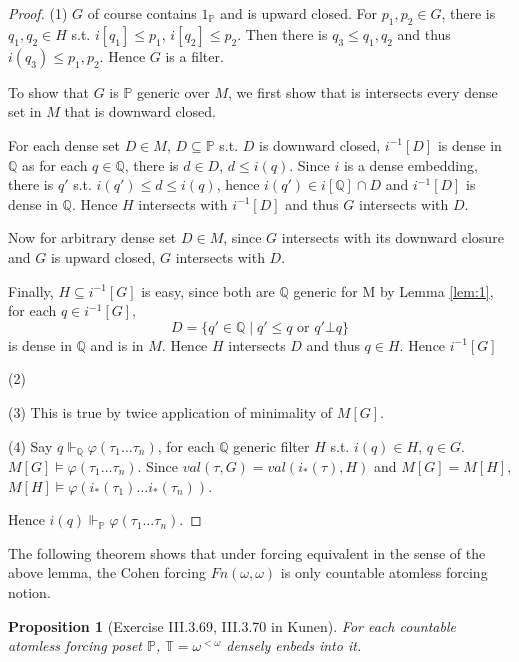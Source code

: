 \documentclass{article}
\newtheorem{proposition}{Proposition}
\newcommand{\bbP}{\mathbb{P}}
\newcommand{\bbQ}{\mathbb{Q}}
\begin{document}
\begin{proof}
    (1) $G$ of course contains $1_\bbP$ and is upward closed. For $p_1,p_2\in G$, there is $q_1,q_2\in H$ s.t. $i[q_1]\leq p_1$, $i[q_2]\leq p_2$. Then there is $q_3\leq q_1,q_2$ and thus $i(q_3)\leq p_1,p_2$. Hence $G$ is a filter. 

    To show that $G$ is $\bbP$ generic over $M$, we first show that is intersects every dense set in $M$ that is downward closed.

    For each dense set $D\in M$, $D\subseteq \bbP$ s.t. $D$ is downward closed, $i^{-1}[D]$ is dense in $\bbQ$ as for each $q\in \bbQ$, there is $d\in D$, $d\leq i(q)$. Since $i$ is a dense embedding, there is $q'$ s.t. $i(q')\leq d\leq i(q)$, hence $i(q')\in i[\bbQ]\cap D$ and $i^{-1}[D]$ is dense in $\bbQ$. Hence $H$ intersects with $i^{-1}[D]$ and thus $G$ intersects with $D$. 

    Now for arbitrary dense set $D\in M$, since $G$ intersects with its downward closure and $G$ is upward closed, $G$ intersects with $D$.

    Finally, $H \subseteq i^{-1}[G]$ is easy, since both are $\bbQ$ generic for M by Lemma \ref{lem:1}, for each $q\in i^{-1}[G]$, $$D = \{q'\in \bbQ\mid q'\leq q\text{ or }q'\bot q\}$$ is dense in $\bbQ$ and is in $M$. Hence $H$ intersects $D$ and thus $q\in H$. Hence $i^{-1}[G]$

    (2) 

    (3) This is true by twice application of minimality of $M[G]$.

    (4) Say $q \Vdash_\bbQ \varphi(\tau_1\dots \tau_n)$, for each $\bbQ$ generic filter $H$ s.t. $i(q)\in H$, $q\in G$. $M[G] \models \varphi(\tau_1\dots \tau_n)$. Since $val(\tau,G) = val(i_*(\tau),H)$ and $M[G] = M[H]$, $M[H]\models \varphi(i_*(\tau_1)\dots i_*(\tau_n))$. 

    Hence $i(q) \Vdash_\bbP \varphi(\tau_1\dots \tau_n)$.
\end{proof}

The following theorem shows that under forcing equivalent in the sense of the above lemma, the Cohen forcing $Fn(\omega,\omega)$ is only countable atomless forcing notion.

\begin{proposition}[Exercise III.3.69, III.3.70 in Kunen]\label{prop:canonical-countable-atomless-forcing}
    For each countable  atomless forcing poset $\mathbb{P}$, $\mathbb{T} = \omega^{<\omega}$ densely enbeds into it.
\end{proposition}
\end{document}
